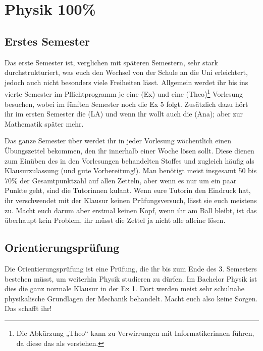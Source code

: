 \section{Physik 100\%}

\subsection{Erstes Semester}
Das erste Semester ist, verglichen mit späteren Semestern, sehr stark durchstrukturiert, was euch den Wechsel von der Schule an die Uni erleichtert, jedoch auch nicht besonders viele Freiheiten lässt.  Allgemein werdet ihr bis ins vierte Semester im Pflichtprogramm je eine  (\gls{Ex}) und eine  (\gls{Theo})\footnote{Die Abkürzung „Theo“ kann zu Verwirrungen mit Informatikerinnen führen, da diese das als  verstehen.} Vorlesung besuchen, wobei im fünften Semester noch die \gls{Ex} 5 folgt. Zusätzlich dazu hört ihr im ersten Semester die  (\gls{LA}) und wenn ihr wollt auch die  (\gls{Ana}); aber zur Mathematik später mehr.

Das ganze Semester über werdet ihr in jeder Vorlesung wöchentlich einen Übungszettel bekommen, den ihr innerhalb einer Woche lösen sollt. Diese dienen zum Einüben des in den Vorlesungen behandelten Stoffes und zugleich häufig als Klausurzulassung (und gute Vorbereitung!). Man benötigt meist insgesamt 50 bis 70\% der Gesamtpunktzahl auf allen Zetteln, aber wenn es nur um ein paar Punkte geht, sind die Tutorinnen kulant. Wenn eure Tutorin den Eindruck hat, ihr verschwendet mit der Klausur keinen Prüfungsversuch, lässt sie euch meistens zu. Macht euch darum aber erstmal keinen Kopf, wenn ihr am Ball bleibt, ist das überhaupt kein Problem, ihr müsst die Zettel ja nicht alle alleine lösen.

\subsection{Orientierungsprüfung}
Die Orientierungsprüfung ist eine Prüfung, die ihr bis zum Ende des 3. Semesters bestehen müsst, um weiterhin Physik studieren zu dürfen. Im Bachelor Physik ist dies die ganz normale Klausur in der \gls{Ex} 1. Dort werden meist sehr schulnahe physikalische Grundlagen der Mechanik behandelt. Macht euch also keine Sorgen. Das schafft ihr!

